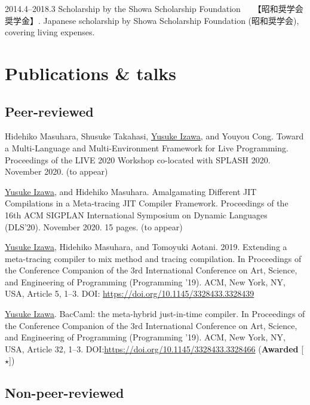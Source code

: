 \documentclass[11pt]{article} %
\newcommand{\YusukeIzawa}{\underline{Yusuke Izawa}}
\newcommand{\伊澤侑祐}{\underline{伊澤侑祐}}
\newcommand{\jit}{\textsc{JIT} }
\begin{document}

\grant
{2014.4--2018.3}
{Scholarship by the Showa Scholarship Foundation~~~【昭和奨学会奨学金】.}
{Japanese scholarship by Showa Scholarship Foundation (昭和奨学会), covering
  living expenses.}


\section*{Publications \& talks}

\subsection*{Peer-reviewed}

 Hidehiko Masuhara, Shusuke Takahasi, \YusukeIzawa, and Youyou
Cong. Toward a Multi-Language and Multi-Environment Framework for Live Programming.
Proceedings of the LIVE 2020 Workshop co-located with SPLASH 2020. November 2020. (to
appear)
\medskip

 \YusukeIzawa, and Hidehiko Masuhara. Amalgamating Different \jit
Compilations in a Meta-tracing \jit Compiler Framework. Proceedings of the 16th ACM
SIGPLAN International Symposium on Dynamic Languages (DLS'20). November 2020. 15
pages. (to appear)
\medskip

 \YusukeIzawa, Hidehiko Masuhara, and Tomoyuki
Aotani. 2019. Extending a meta-tracing compiler to mix method and tracing
compilation. In Proceedings of the Conference Companion of the 3rd International
Conference on Art, Science, and Engineering of Programming (Programming
’19). ACM, New York, NY, USA, Article 5, 1–3. DOI:
\url{https://doi.org/10.1145/3328433.3328439}
\medskip

 \YusukeIzawa. BacCaml: the meta-hybrid just-in-time compiler. In
Proceedings of the Conference Companion of the 3rd International Conference on
Art, Science, and Engineering of Programming (Programming ’19). ACM, New York,
NY, USA, Article 32, 1–3. DOI:\url{https://doi.org/10.1145/3328433.3328466}
(\textbf{Awarded} [$\star$])
\medskip

\subsection*{Non-peer-reviewed}
\end{document}
